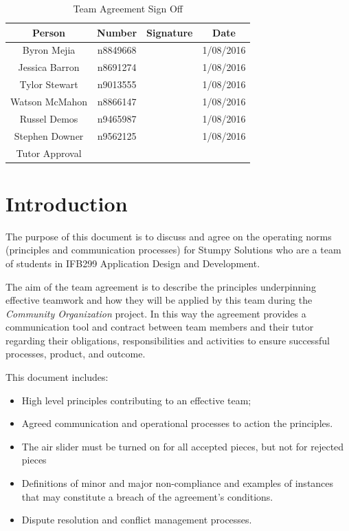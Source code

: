\documentclass[12pt, a4paper, onecolumn]{article}
\begin{document}
\begin{table}[H]
  \centering

  \begin{tabular}{ | c | c | c | c | }
    \hline
    Person         & Number    & Signature & Date      \\
    \hline
    Byron Mejia    & n8849668  &           & 1/08/2016 \\
    \hline
    Jessica Barron & n8691274  &           & 1/08/2016 \\
    \hline
    Tylor Stewart	 & n9013555  &           & 1/08/2016 \\
    \hline
    Watson McMahon & n8866147  &           & 1/08/2016 \\
    \hline
    Russel Demos   & n9465987  &           & 1/08/2016 \\
    \hline
    Stephen Downer & n9562125  &           & 1/08/2016 \\
    \hline
    Tutor Approval &           &           &           \\
    \hline
  \end{tabular}

  \caption{Team Agreement Sign Off}
  \label{table:signOffs}
\end{table}

\newpage
\tableofcontents

\newpage
\section{Introduction}
The purpose of this document is to discuss and agree on the operating norms
(principles and communication processes) for Stumpy Solutions who are a team
of students in IFB299 Application Design and Development.

The aim of the team agreement is to describe the principles underpinning
effective teamwork and how they will be applied by this team during the
\textit{Community Organization} project.  In this way the agreement provides a
communication tool and contract between team members and their tutor
regarding their obligations, responsibilities and activities to ensure
successful processes, product, and outcome.

This document includes:
\begin{itemize}
  \setlength\itemsep{1px}
  \item High level principles contributing to an effective team;
  \item Agreed communication and operational processes to action
  the principles.
  \item The air slider must be turned on for all accepted pieces,
  but not for rejected pieces
  \item	Definitions of minor and major non-compliance and examples
  of instances that may constitute a breach of the agreement’s conditions.
  \item	Dispute resolution and conflict management processes.
\end{itemize}
\end{document}
